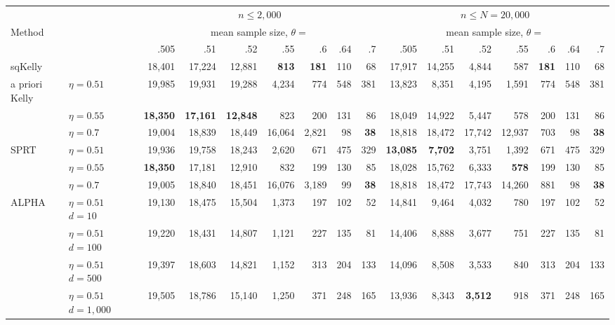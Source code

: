 \documentclass[aoas]{imsart}
\begin{document}
\begin{table}
\centering
\tiny
\begin{tabular}{ll|rrrrrrr|rrrrrrr}& & \multicolumn{7}{|c|}{$n \le2{,}000$} &  \multicolumn{7}{|c}{$n \le N=20{,}000$} \\ 
Method & & \multicolumn{7}{c|}{mean sample size, $\theta=$}  & \multicolumn{7}{|c}{mean sample size, $\theta=$ }\\ 
& & .505 & .51 & .52 & .55 & .6 & .64 & .7  & .505 & .51 & .52 & .55 & .6 & .64 & .7  \\ 
\hline
sqKelly  &  & 18,401  & 17,224  & 12,881  & \bf{813}  & \bf{181}  & 110  & 68   & 17,917  & 14,255  & 4,844  & 587  & \bf{181}  & 110  & 68  \\ 
\hline
a priori Kelly & $\eta=0.51$   & 19,985  & 19,931  & 19,288  & 4,234  & 774  & 548  & 381   & 13,823  & 8,351  & 4,195  & 1,591  & 774  & 548  & 381  \\ 
 & $\eta=0.55$   & \bf{18,350}  & \bf{17,161}  & \bf{12,848}  & 823  & 200  & 131  & 86   & 18,049  & 14,922  & 5,447  & 578  & 200  & 131  & 86  \\ 
 & $\eta=0.7$   & 19,004  & 18,839  & 18,449  & 16,064  & 2,821  & 98  & \bf{38}   & 18,818  & 18,472  & 17,742  & 12,937  & 703  & 98  & \bf{38}  \\ 
\hline
 SPRT & $\eta=0.51$  & 19,936  & 19,758  & 18,243  & 2,620  & 671  & 475  & 329   & \bf{13,085}  & \bf{7,702}  & 3,751  & 1,392  & 671  & 475  & 329  \\  
 & $\eta=0.55$  & \bf{18,350}  & 17,181  & 12,910  & 832  & 199  & 130  & 85   & 18,028  & 15,762  & 6,333  & \bf{578}  & 199  & 130  & 85  \\  
 & $\eta=0.7$  & 19,005  & 18,840  & 18,451  & 16,076  & 3,189  & 99  & \bf{38}   & 18,818  & 18,472  & 17,743  & 14,260  & 881  & 98  & \bf{38}  \\  
\hline
ALPHA & $\eta=0.51$ $d=10$ & 19,130  & 18,475  & 15,504  & 1,373  & 197  & 102  & 52  & 14,841  & 9,464  & 4,032  & 780  & 197  & 102  & 52  \\ 
 & $\eta=0.51$ $d=100$ & 19,220  & 18,431  & 14,807  & 1,121  & 227  & 135  & 81  & 14,406  & 8,888  & 3,677  & 751  & 227  & 135  & 81  \\ 
 & $\eta=0.51$ $d=500$ & 19,397  & 18,603  & 14,821  & 1,152  & 313  & 204  & 133  & 14,096  & 8,508  & 3,533  & 840  & 313  & 204  & 133  \\ 
 & $\eta=0.51$ $d=1{,}000$ & 19,505  & 18,786  & 15,140  & 1,250  & 371  & 248  & 165  & 13,936  & 8,343  & \bf{3,512}  & 918  & 371  & 248  & 165  \\ 

\end{tabular}
\end{table}
\end{document}
